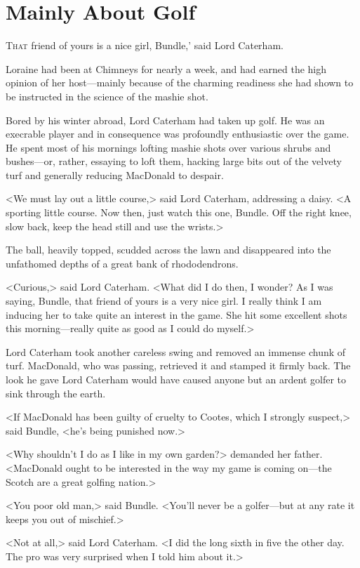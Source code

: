 \chapter{Mainly About Golf}

\lettrine[ante=`]{T}{hat}  friend of yours is a nice girl, Bundle,' said Lord Caterham.

\zz
Loraine had been at Chimneys for nearly a week, and had earned the high opinion of her host—mainly because of the charming readiness she had shown to be instructed in the science of the mashie shot.

Bored by his winter abroad, Lord Caterham had taken up golf. He was an execrable player and in consequence was profoundly enthusiastic over the game. He spent most of his mornings lofting mashie shots over various shrubs and bushes—or, rather, essaying to loft them, hacking large bits out of the velvety turf and generally reducing MacDonald to despair.

<We must lay out a little course,> said Lord Caterham, addressing a daisy. <A sporting little course. Now then, just watch this one, Bundle. Off the right knee, slow back, keep the head still and use the wrists.>

The ball, heavily topped, scudded across the lawn and disappeared into the unfathomed depths of a great bank of rhododendrons.

<Curious,> said Lord Caterham. <What did I do then, I wonder? As I was saying, Bundle, that friend of yours is a very nice girl. I really think I am inducing her to take quite an interest in the game. She hit some excellent shots this morning—really quite as good as I could do myself.>

Lord Caterham took another careless swing and removed an immense chunk of turf. MacDonald, who was passing, retrieved it and stamped it firmly back. The look he gave Lord Caterham would have caused anyone but an ardent golfer to sink through the earth.

<If MacDonald has been guilty of cruelty to Cootes, which I strongly suspect,> said Bundle, <he's being punished now.>

<Why shouldn't I do as I like in my own garden?> demanded her father. <MacDonald ought to be interested in the way my game is coming on—the Scotch are a great golfing nation.>

<You poor old man,> said Bundle. <You'll never be a golfer—but at any rate it keeps you out of mischief.>

<Not at all,> said Lord Caterham. <I did the long sixth in five the other day. The pro was very surprised when I told him about it.>

